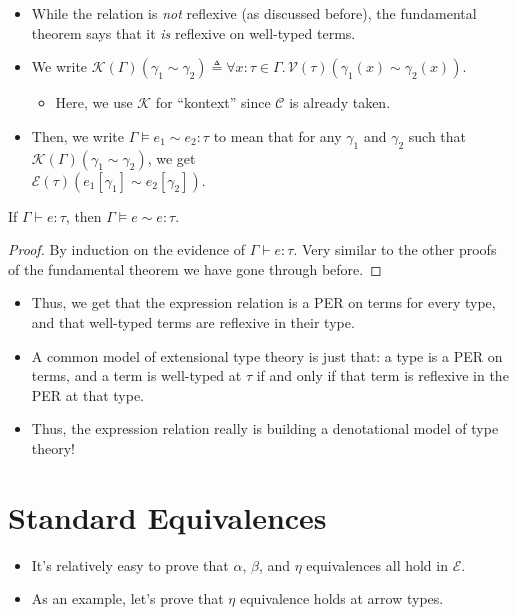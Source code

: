\documentclass{lecturenotes}
\begin{document}
\newpage
\begin{itemize}
\item While the relation is \emph{not} reflexive (as discussed before), the fundamental theorem says that it \emph{is} reflexive on well-typed terms.
\item We write $\mathcal{K}(\Gamma)(\gamma_1 \sim \gamma_2) \triangleq \forall x : \tau \in \Gamma.\,\mathcal{V}(\tau)(\gamma_1(x) \sim \gamma_2(x))$.
  \begin{itemize}
  \item Here, we use $\mathcal{K}$ for ``kontext'' since $\mathcal{C}$ is already taken.
  \end{itemize}
\item Then, we write $\Gamma \vDash e_1 \sim e_2 : \tau$ to mean that for any $\gamma_1$ and $\gamma_2$ such that $\mathcal{K}(\Gamma)(\gamma_1 \sim \gamma_2)$, we get\\ $\mathcal{E}(\tau)(e_1[\gamma_1] \sim e_2[\gamma_2])$.
\end{itemize}

\begin{thm}
  If $\Gamma \vdash e : \tau$, then $\Gamma \vDash e \sim e : \tau$.
\end{thm}
\begin{proof}
  By induction on the evidence of $\Gamma \vdash e : \tau$.
  Very similar to the other proofs of the fundamental theorem we have gone through before.
\end{proof}

\begin{itemize}
\item Thus, we get that the expression relation is a PER on terms for every type, and that well-typed terms are reflexive in their type.
\item A common model of extensional type theory is just that: a type is a PER on terms, and a term is well-typed at $\tau$ if and only if that term is reflexive in the PER at that type.
\item Thus, the expression relation really is building a denotational model of type theory!
\end{itemize}

\section{Standard Equivalences}
\label{sec:stand-equiv}

\begin{itemize}
\item It's relatively easy to prove that $\alpha$, $\beta$, and $\eta$ equivalences all hold in $\mathcal{E}$.
\item As an example, let's prove that $\eta$ equivalence holds at arrow types.
\end{itemize}
\end{document}
